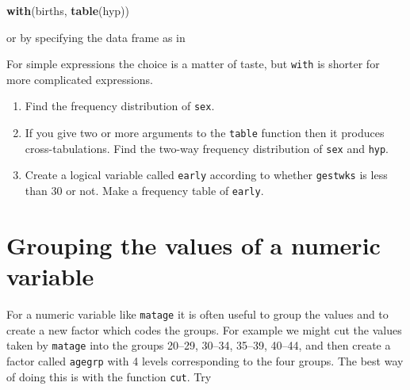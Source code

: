 \documentclass[
]{book}
\newenvironment{Shaded}{\begin{snugshade}}{\end{snugshade}}
\newcommand{\AttributeTok}[1]{\textcolor[rgb]{0.13,0.29,0.53}{#1}}
\newcommand{\ConstantTok}[1]{\textcolor[rgb]{0.56,0.35,0.01}{#1}}
\newcommand{\DecValTok}[1]{\textcolor[rgb]{0.00,0.00,0.81}{#1}}
\newcommand{\FunctionTok}[1]{\textcolor[rgb]{0.13,0.29,0.53}{\textbf{#1}}}
\newcommand{\NormalTok}[1]{#1}
\newcommand{\OtherTok}[1]{\textcolor[rgb]{0.56,0.35,0.01}{#1}}
\newcommand{\SpecialCharTok}[1]{\textcolor[rgb]{0.81,0.36,0.00}{\textbf{#1}}}
\begin{document}
\begin{Shaded}
\begin{Highlighting}[]
\FunctionTok{with}\NormalTok{(births, }\FunctionTok{table}\NormalTok{(hyp))}
\end{Highlighting}
\end{Shaded}

or by specifying the data frame as in

\begin{Shaded}
\end{Shaded}

For simple expressions the choice is a matter of taste, but \texttt{with}
is shorter for more complicated expressions.

\begin{enumerate}
\def\labelenumi{\arabic{enumi}.}
\item
  Find the frequency distribution of \texttt{sex}.
\item
  If you give two or more arguments to the \texttt{table} function
  then it produces cross-tabulations. Find the two-way frequency
  distribution of \texttt{sex} and \texttt{hyp}.
\item
  Create a logical variable called \texttt{early} according to whether \texttt{gestwks}
  is less than 30 or not. Make a frequency table of \texttt{early}.
\end{enumerate}

\section{Grouping the values of a numeric variable}\label{grouping-the-values-of-a-numeric-variable}

For a numeric variable like \texttt{matage} it is often useful
to group the values and to create a new factor which codes the groups.
For example we might cut the values taken by \texttt{matage} into the
groups 20--29, 30--34, 35--39, 40--44, and then create a factor called
\texttt{agegrp} with 4 levels corresponding to the four groups. The best way of doing this is
with the function \texttt{cut}. Try

\begin{Shaded}
\end{Shaded}
\end{document}
